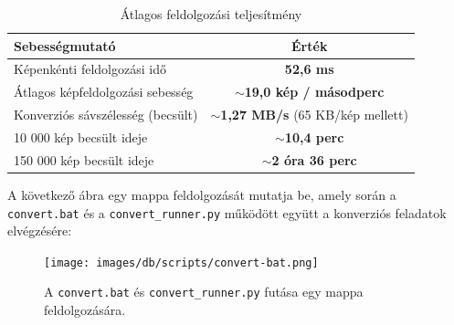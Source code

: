 \documentclass[	
  noindent
]{elteikthesis}[2024/04/26]
\begin{document}
      \vspace{1em}
      \begin{table}[H]
      \centering
      \caption{Átlagos feldolgozási teljesítmény}
      \begin{tabular}{|l|c|}
      \hline
      \textbf{Sebességmutató} & \textbf{Érték} \\
      \hline
      Képenkénti feldolgozási idő & \textbf{52,6 ms} \\
      Átlagos képfeldolgozási sebesség & \textbf{$\sim$19,0 kép / másodperc} \\
      Konverziós sávszélesség (becsült) & \textbf{$\sim$1,27 MB/s} (65 KB/kép mellett) \\
      10 000 kép becsült ideje & \textbf{$\sim$10,4 perc} \\
      150 000 kép becsült ideje & \textbf{$\sim$2 óra 36 perc} \\
      \hline
      \end{tabular}
      \end{table}
      
      \vspace{1em}
      
      A következő ábra egy mappa feldolgozását mutatja be, amely során a \texttt{convert.bat} és a \texttt{convert\_runner.py} működött együtt a konverziós feladatok elvégzésére:
      
      \begin{figure}[H]
        \centering
        \texttt{[image: images/db/scripts/convert-bat.png]}
        \caption{A \texttt{convert.bat} és \texttt{convert\_runner.py} futása egy mappa feldolgozására.}
        \label{fig:01_convert-bat}
      \end{figure}
    
\end{document}
